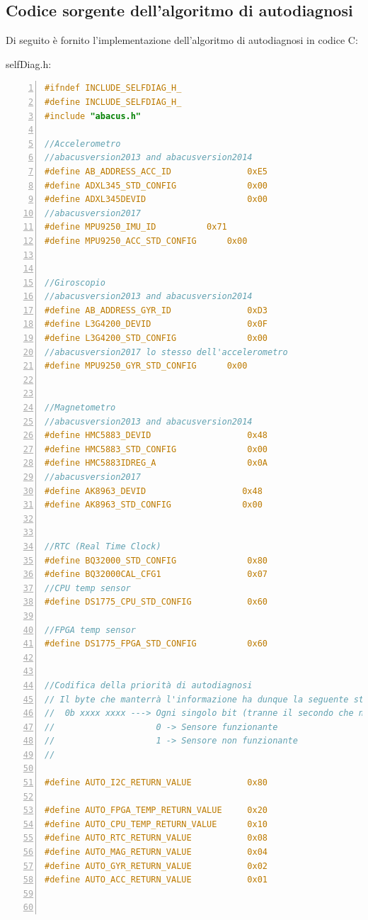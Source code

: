 \documentclass[LaM,binding=0.6cm,oneside]{../sapthesis}
\begin{document}
\clearpage
\subsection{Codice sorgente dell'algoritmo di autodiagnosi}
Di seguito è fornito l'implementazione dell'algoritmo di autodiagnosi in codice C:

selfDiag.h:
\begin{lstlisting}[language=C,
                   basicstyle=\scriptsize,
                   numbers=left,
                   stepnumber=0,
                   numbersep=4pt,
                   tabsize=2,
                   showspaces=false,
                   showstringspaces=false]
#ifndef INCLUDE_SELFDIAG_H_
#define INCLUDE_SELFDIAG_H_
#include "abacus.h"

//Accelerometro
//abacusversion2013 and abacusversion2014
#define AB_ADDRESS_ACC_ID               0xE5
#define ADXL345_STD_CONFIG              0x00
#define ADXL345DEVID                    0x00
//abacusversion2017
#define MPU9250_IMU_ID			0x71
#define MPU9250_ACC_STD_CONFIG		0x00	


//Giroscopio
//abacusversion2013 and abacusversion2014
#define AB_ADDRESS_GYR_ID               0xD3
#define L3G4200_DEVID                   0x0F
#define L3G4200_STD_CONFIG              0x00
//abacusversion2017 lo stesso dell'accelerometro
#define MPU9250_GYR_STD_CONFIG		0x00


//Magnetometro
//abacusversion2013 and abacusversion2014
#define HMC5883_DEVID                   0x48   
#define HMC5883_STD_CONFIG              0x00
#define HMC5883IDREG_A                  0x0A
//abacusversion2017
#define AK8963_DEVID                   0x48
#define AK8963_STD_CONFIG              0x00


//RTC (Real Time Clock)
#define BQ32000_STD_CONFIG              0x80
#define BQ32000CAL_CFG1                 0x07
//CPU temp sensor
#define DS1775_CPU_STD_CONFIG           0x60

//FPGA temp sensor
#define DS1775_FPGA_STD_CONFIG          0x60


//Codifica della priorità di autodiagnosi
// Il byte che manterrà l'informazione ha dunque la seguente struttura:
//  0b xxxx xxxx ---> Ogni singolo bit (tranne il secondo che non Ã¨ utilizzato) avrÃ  la seguente logica:
//                    0 -> Sensore funzionante
//                    1 -> Sensore non funzionante
//

#define AUTO_I2C_RETURN_VALUE           0x80

#define AUTO_FPGA_TEMP_RETURN_VALUE     0x20
#define AUTO_CPU_TEMP_RETURN_VALUE      0x10
#define AUTO_RTC_RETURN_VALUE           0x08
#define AUTO_MAG_RETURN_VALUE           0x04
#define AUTO_GYR_RETURN_VALUE           0x02
#define AUTO_ACC_RETURN_VALUE           0x01



\end{lstlisting}
\end{document}
